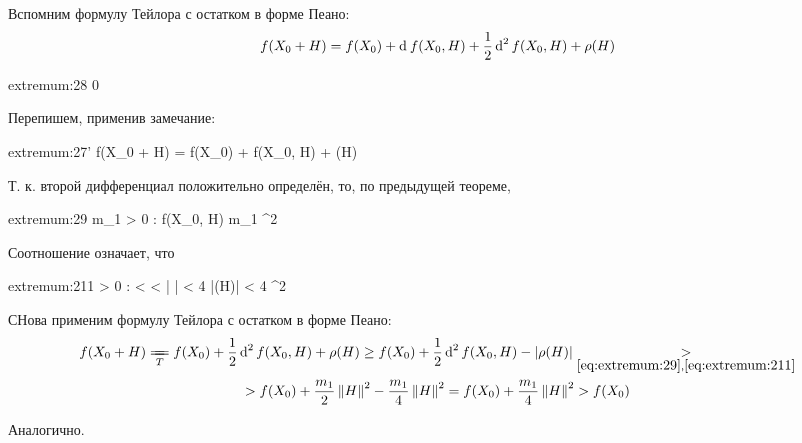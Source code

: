 \begin{eproof}
	\item Вспомним формулу Тейлора с остатком в форме Пеано:
	$$ f(X_0 + H) = f(X_0) + \di f(X_0, H) + \half \di[2] f(X_0, H) + \rho(H) $$
	\begin{equ}{extremum:28}
		   0
	\end{equ}
	Перепишем, применив замечание:
	\begin{equ}{extremum:27'}
		f(X_0 + H) = f(X_0) + \half \di[2] f(X_0, H) + \rho(H)
	\end{equ}
	Т. к. второй дифференциал положительно определён, то, по предыдущей теореме,
	\begin{equ}{extremum:29}
		\exist m_1 > 0 : \di[2] f(X_0, H) \ge m_1 ^2
	\end{equ}
	Соотношение  означает, что
	\begin{equ}{extremum:211}
		\exist \delta > 0 :  <  < \delta \quad \bigg|  \bigg| < 4 \qquad \iff |\rho(H)| < 4 ^2
	\end{equ}
	СНова применим формулу Тейлора с остатком в форме Пеано:
	\begin{multline*}
		f(X_0 + H) \undereq T f(X_0) + \half\di[2] f(X_0, H) + \rho(H) \ge f(X_0) + \half \di[2] f(X_0, H) - |\rho(H)| \underset{\eref{extremum:29}, \eref{extremum:211}}> \\
		> f(X_0) + \half[m_1]\norm{H}^2 - \frac{m_1}4\norm{H}^2 = f(X_0) + \frac{m_1}4\norm{H}^2 > f(X_0)
	\end{multline*}

	\item Аналогично.


\end{eproof}
